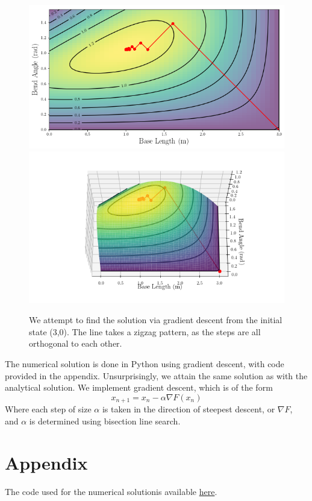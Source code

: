 \documentclass{article}
\begin{document}
\begin{figure}[h]
\includegraphics[scale = 0.43]{2dplotoptimized.png}
\includegraphics[trim = {3cm, 1cm, 3cm, 1.5cm}, clip, scale = 0.53]{3dplotoptimized.png}
\caption{We attempt to find the solution via gradient descent from the initial state (3,0). The line takes a zigzag pattern, as the steps are all orthogonal to each other. }
\end{figure}
The numerical solution is done in Python using gradient descent, with code provided in the appendix. Unsurprisingly, we attain the same solution as with the analytical solution. We implement gradient descent, which is of the form 
$$ x_{n+1} = x_n - \alpha \nabla F(x_n)$$
Where each step of size $\alpha$ is taken in the direction of steepest descent, or $\nabla F$, and $\alpha$ is determined using bisection line search.



\section*{Appendix}
The code used for the numerical solutionis available \href{https://github.com/thetruejacob/CS164/blob/master/Exact%20Line%20Search.ipynb}{here}.
\end{document}
